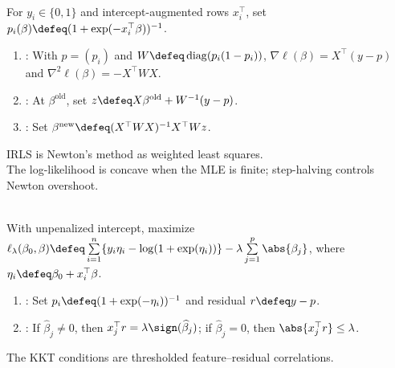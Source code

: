 \begin{method} \label{meth:sl-logistic-irls} \\
For $y_i\in\{0,1\}$ and intercept-augmented rows $x_i^\top$, set $p_i(\beta)\defeq(1+\exp(-x_i^\top\beta))^{-1}$.
\begin{enumerate}[label=(\roman*)]
\setlength{\itemsep}{0pt}
\item {}: With $p=(p_i)$ and $W\defeq\operatorname{diag}(p_i(1-p_i))$, $\nabla\ell(\beta)=X^\top(y-p)$ and $\nabla^2\ell(\beta)=-X^\top W X$.
\item {}: At $\beta^{\mathrm{old}}$, set $z\defeq X\beta^{\mathrm{old}}+W^{-1}(y-p)$.
\item {}: Set $\beta^{\mathrm{new}}\defeq(X^\top W X)^{-1}X^\top Wz$.
\end{enumerate}
IRLS is Newton's method as weighted least squares.\\
The log-likelihood is concave when the MLE is finite; step-halving controls Newton overshoot.
\end{method}

\begin{method} \label{meth:sl-l1-logistic-regression} \\
With unpenalized intercept, maximize $\ell_\lambda(\beta_0,\beta)\defeq\sum\limits_{i=1}^{n}\{y_i\eta_i-\log(1+\exp(\eta_i))\}-\lambda\sum\limits_{j=1}^{p}\abs{\beta_j}$, where $\eta_i\defeq\beta_0+x_i^\top\beta$.
\begin{enumerate}[label=(\roman*)]
\setlength{\itemsep}{0pt}
\item {}: Set $p_i\defeq(1+\exp(-\eta_i))^{-1}$ and residual $r\defeq y-p$.
\item {}: If $\widehat{\beta}_j\neq0$, then $x_j^\top r=\lambda\sign(\widehat{\beta}_j)$; if $\widehat{\beta}_j=0$, then $\abs{x_j^\top r}\leq\lambda$.
\end{enumerate}
The KKT conditions are thresholded feature--residual correlations.
\end{method}

